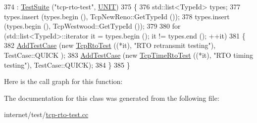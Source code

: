 \begin{DoxyCode}
374                      : \hyperlink{classns3_1_1TestSuite_a904b0c40583b744d30908aeb94636d1a}{TestSuite} (\textcolor{stringliteral}{"tcp-rto-test"}, \hyperlink{classns3_1_1TestSuite_a1ebfcab34ec8161e085e8e3a1855eae0a3885375a3787abf60431f8454b3cadbd}{UNIT})
375   \{
376     std::list<TypeId> types;
377     types.insert (types.begin (), TcpNewReno::GetTypeId ());
378     types.insert (types.begin (), TcpWestwood::GetTypeId ());
379 
380     \textcolor{keywordflow}{for} (std::list<TypeId>::iterator it = types.begin (); it != types.end (); ++it)
381       \{
382         \hyperlink{classns3_1_1TestCase_a3718088e3eefd5d6454569d2e0ddd835}{AddTestCase} (\textcolor{keyword}{new} \hyperlink{classTcpRtoTest}{TcpRtoTest} ((*it), \textcolor{stringliteral}{"RTO retransmit testing"}), TestCase::QUICK
      );
383         \hyperlink{classns3_1_1TestCase_a3718088e3eefd5d6454569d2e0ddd835}{AddTestCase} (\textcolor{keyword}{new} \hyperlink{classTcpTimeRtoTest}{TcpTimeRtoTest} ((*it), \textcolor{stringliteral}{"RTO timing testing"}), 
      TestCase::QUICK);
384       \}
385   \}
\end{DoxyCode}


Here is the call graph for this function\+:




The documentation for this class was generated from the following file\+:\begin{DoxyCompactItemize}
\item 
internet/test/\hyperlink{tcp-rto-test_8cc}{tcp-\/rto-\/test.\+cc}\end{DoxyCompactItemize}
